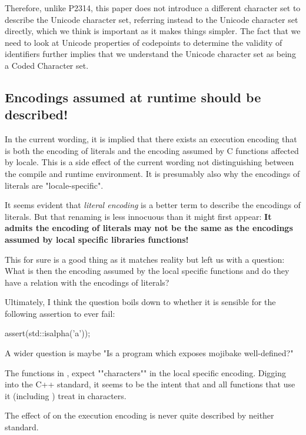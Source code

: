 \documentclass{wg21}
\begin{document}
Therefore, unlike P2314, this paper does not introduce a different character set to describe the Unicode character set, referring instead
to the Unicode character set directly, which we think is important as it makes things simpler.
The fact that we need to look at Unicode properties of codepoints to determine the validity of identifiers further implies that we understand the Unicode character set as being a Coded Character set.


\subsection{Encodings assumed at runtime should be described!}

In the current wording, it is implied that there exists an execution encoding that is both the encoding of literals and
the encoding assumed by C functions affected by locale.
This is a side effect of the current wording not distinguishing between the compile and runtime environment.
It is presumably also why the encodings of literals are "locale-specific".

It seems evident that \emph{literal encoding} is a better term to describe the encodings of literals.
But that renaming is less innocuous than it might first appear:
\textbf{It admits the encoding of literals may not be the same as the encodings assumed by local specific libraries functions!}

This for sure is a good thing as it matches reality but left us with a question: What is then the encoding assumed by the local specific functions and do they have a relation with the encodings of literals?

Ultimately, I think the question boils down to whether it is sensible for the following assertion to ever fail:

\begin{colorblock}
assert(std::isalpha('a'));
\end{colorblock}

A wider question is maybe "Is a program which exposes mojibake well-defined?"

The functions in ,  expect ""characters"" in the local specific encoding.
Digging into the C++ standard, it seems to be the intent that 
and all functions that use it (including ) treat in characters.

The effect of  on the execution encoding is never quite described by neither standard.
\end{document}
